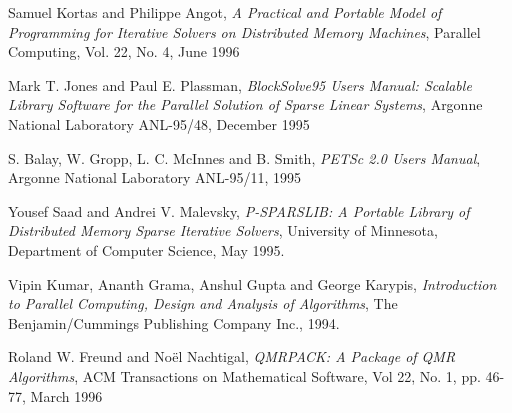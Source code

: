 \documentclass[11pt,a4paper,english,oneside]{report}
\begin{document}
\begin{thebibliography}{1}
	Samuel Kortas and Philippe Angot, {\em A Practical and Portable
	Model of Programming for Iterative Solvers on Distributed Memory
	Machines}, Parallel Computing, Vol. 22, No. 4, June 1996

	Mark T. Jones and Paul E. Plassman, {\em BlockSolve95 Users Manual:
	Scalable Library Software for the Parallel Solution of Sparse
	Linear Systems}, Argonne National Laboratory ANL-95/48,
	December 1995

	S. Balay, W. Gropp, L. C. McInnes and B. Smith, {\em PETSc 2.0
	Users Manual}, Argonne National Laboratory ANL-95/11, 1995

	Yousef Saad and Andrei V. Malevsky, {\em P-SPARSLIB: A Portable
	Library of Distributed Memory Sparse Iterative Solvers},
	University of Minnesota, Department of Computer Science, May 1995.

	Vipin Kumar, Ananth Grama, Anshul Gupta and George Karypis,
	{\em Introduction to Parallel Computing, Design and Analysis
	of Algorithms}, The Benjamin/Cummings Publishing Company Inc.,
	1994.

	Roland W. Freund and No\"el Nachtigal, {\em QMRPACK: A Package
	of QMR Algorithms}, ACM Transactions on Mathematical Software,
	Vol 22, No. 1, pp. 46-77, March 1996

\end{thebibliography}

\label{page:last}
\end{document}
